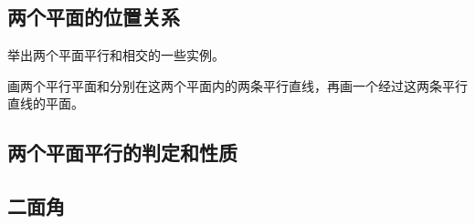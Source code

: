 \subsection{两个平面的位置关系}
\begin{Practice}
  \begin{question}
    \item 举出两个平面平行和相交的一些实例。
    \item 画两个平行平面和分别在这两个平面内的两条平行直线，再画一个经过这两条平行直线的平面。
  \end{question}
\end{Practice}
\subsection{两个平面平行的判定和性质}
\begin{Practice}
  \begin{question}
    \item 
    \item 
    \item 
  \end{question}
\end{Practice}
\begin{Exercise}
  \begin{question}
    \item 
    \item 
    \item 
    \item 
    \item 
    \item 
    \item 
    \item 
    \item 
    \item 
  \end{question}
\end{Exercise}

\subsection{二面角}
\begin{Practice}
  \begin{question}
    \item 
    \item 
    \item 
    \item 
  \end{question}
\end{Practice}

